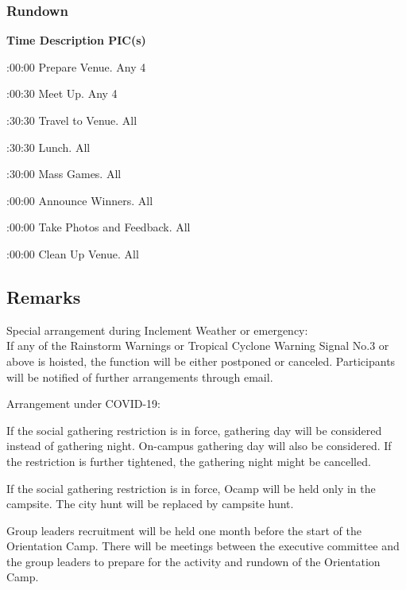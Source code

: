 \subsubsection{Rundown}

\setupTABLE[c][1][width=1.25in]
\setupTABLE[c][2][width=3.5in]
\setupTABLE[c][3][width=1.25in]
\bTABLE
\bTABLEhead

\bTR\bTH    \bf{Time}
\eTH\bTH    \bf{Description}
\eTH\bTH    \bf{PIC(s)}
\eTH\eTR

\eTABLEhead
\bTABLEbody

\bTR{}:00:00
\eTD\bTD Prepare Venue.
\eTD\bTD Any 4
\eTD\eTR

\bTR{}:00:30
\eTD\bTD Meet Up.
\eTD\bTD Any 4
\eTD\eTR

\bTR{}:30:30
\eTD\bTD Travel to Venue.
\eTD\bTD All
\eTD\eTR

\bTR{}:30:30
\eTD\bTD Lunch.
\eTD\bTD All
\eTD\eTR

\bTR{}:30:00
\eTD\bTD Mass Games.
\eTD\bTD All
\eTD\eTR

\bTR{}:00:00
\eTD\bTD Announce Winners.
\eTD\bTD All
\eTD\eTR

\bTR{}:00:00
\eTD\bTD Take Photos and Feedback.
\eTD\bTD All
\eTD\eTR

\bTR{}:00:00
\eTD\bTD Clean Up Venue.
\eTD\bTD All
\eTD\eTR

\eTABLEbody
\eTABLE

\subsection{Remarks}
\startitemize
\item Special arrangement during Inclement Weather or emergency: \\
If any of the Rainstorm Warnings or Tropical Cyclone Warning Signal No.3 or above is hoisted, the function will be either postponed or canceled. Participants will be notified of further arrangements through email.
\item Arrangement under COVID-19: \startitemize
\item If the social gathering restriction is in force, gathering day will be considered instead of gathering night. On-campus gathering day will also be considered. If the restriction is further tightened, the gathering night might be cancelled.
\item If the social gathering restriction is in force, Ocamp will be held only in the campsite. The city hunt will be replaced by campsite hunt. \stopitemize
\item Group leaders recruitment will be held one month before the start of the Orientation Camp. There will be meetings between the executive committee and the group leaders to prepare for the activity and rundown of the Orientation Camp. 
\stopitemize

\stopsection
\pagebreak
